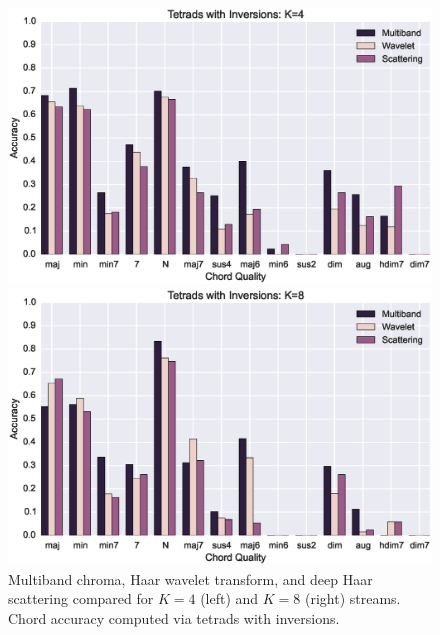 \documentclass{article}
\begin{document}
\begin{figure}[h!]
\centering
\begin{minipage}{\columnwidth}
	\centering
	\includegraphics[width=1.05\columnwidth]{figs/tetrad_inv4.eps}
\end{minipage}
\begin{minipage}{\columnwidth}
	\centering
	\includegraphics[width=1.05\columnwidth]{figs/tetrad_inv8.eps}
\end{minipage}
\caption{Multiband chroma, Haar wavelet transform, and deep Haar scattering compared for $K=4$ (left) and $K=8$ (right) streams. Chord accuracy computed via tetrads with inversions.}
\label{fig:tetrads}
\end{figure}
\end{document}

